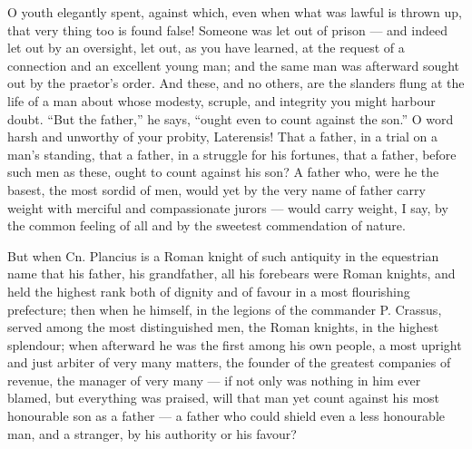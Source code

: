  O youth elegantly spent, against which, even when what was lawful is thrown up, that very thing too is found false! Someone was let out of prison --- and indeed let out by an oversight, let out, as you have learned, at the request of a connection and an excellent young man; and the same man was afterward sought out by the praetor's order. And these, and no others, are the slanders flung at the life of a man about whose modesty, scruple, and integrity you might harbour doubt. ``But the father,'' he says, ``ought even to count against the son.'' O word harsh and unworthy of your probity, Laterensis! That a father, in a trial on a man's standing, that a father, in a struggle for his fortunes, that a father, before such men as these, ought to count against his son? A father who, were he the basest, the most sordid of men, would yet by the very name of father carry weight with merciful and compassionate jurors --- would carry weight, I say, by the common feeling of all and by the sweetest commendation of nature.

 But when Cn. Plancius is a Roman knight of such antiquity in the equestrian name that his father, his grandfather, all his forebears were Roman knights, and held the highest rank both of dignity and of favour in a most flourishing prefecture; then when he himself, in the legions of the commander P. Crassus, served among the most distinguished men, the Roman knights, in the highest splendour; when afterward he was the first among his own people, a most upright and just arbiter of very many matters, the founder of the greatest companies of revenue, the manager of very many --- if not only was nothing in him ever blamed, but everything was praised, will that man yet count against his most honourable son as a father --- a father who could shield even a less honourable man, and a stranger, by his authority or his favour?

